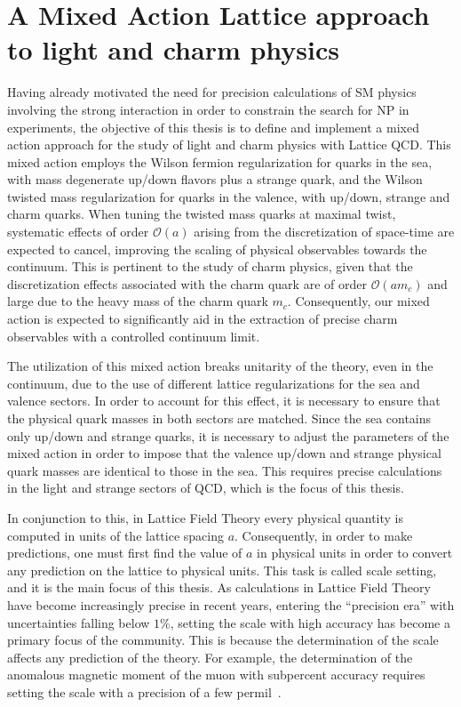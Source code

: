 \section*{A Mixed Action Lattice approach to light and charm physics}

Having already motivated the need for precision calculations of SM physics involving the strong interaction in order to constrain the search for NP in experiments, the objective of this thesis is to define and implement a mixed action approach for the study of light and charm physics with Lattice QCD. This mixed action employs the Wilson fermion regularization for quarks in the sea, with mass degenerate up/down flavors plus a strange quark, and the Wilson twisted mass regularization for quarks in the valence, with up/down, strange and charm quarks. When tuning the twisted mass quarks at maximal twist, systematic effects of order $\mathcal{O}(a)$ arising from the discretization of space-time are expected to cancel, improving the scaling of physical observables towards the continuum. This is pertinent to the study of charm physics, given that the discretization effects associated with the charm quark are of order $\mathcal{O}(am_c)$ and large due to the heavy mass of the charm quark $m_c$. Consequently, our mixed action is expected to significantly aid in the extraction of precise charm observables with a controlled continuum limit.

The utilization of this mixed action breaks unitarity of the theory, even in the continuum, due to the use of different lattice regularizations for the sea and valence sectors. In order to account for this effect, it is necessary to ensure that the physical quark masses in both sectors are matched. Since the sea contains only up/down and strange quarks, it is necessary to adjust the parameters of the mixed action in order to impose that the valence up/down and strange physical quark masses are identical to those in the sea. This requires precise calculations in the light and strange sectors of QCD, which is the focus of this thesis.

In conjunction to this, in Lattice Field Theory every physical quantity is computed in units of the lattice spacing $a$. Consequently, in order to make predictions, one must first find the value of $a$ in physical units in order to convert any prediction on the lattice to physical units. This task is called scale setting, and it is the main focus of this thesis. As calculations in Lattice Field Theory have become increasingly precise in recent years, entering the ``precision era'' with uncertainties falling below $1\%$, setting the scale with high accuracy has become a primary focus of the community. This is because the determination of the scale affects any prediction of the theory. For example, the determination of the anomalous magnetic moment of the muon with subpercent accuracy requires setting the scale with a precision of a few permil~\citep{Borsanyi:2020mff}.

